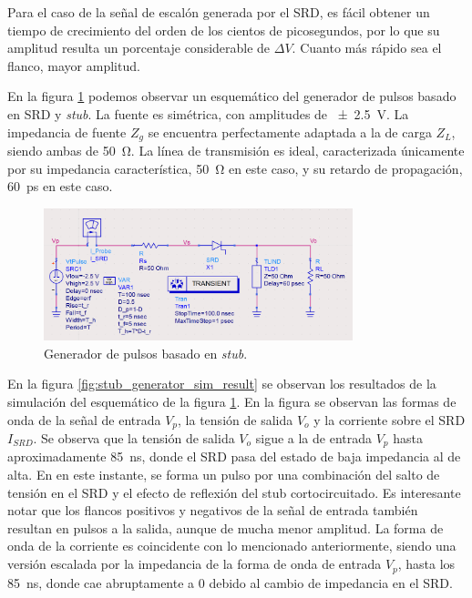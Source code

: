 Para el caso de la señal de escalón generada por el SRD, es fácil obtener un
tiempo de crecimiento del orden de los cientos de picosegundos, por lo que su
amplitud resulta un porcentaje considerable de $\Delta V$. Cuanto más rápido sea
el flanco, mayor amplitud.

En la figura \ref{fig:stub_generator_circuit} podemos observar un esquemático
del generador de pulsos basado en SRD y \textit{stub}. La fuente es simétrica,
con amplitudes de \qty{\pm 2.5}{\volt}. La impedancia de fuente $Z_g$ se
encuentra perfectamente adaptada a la de carga $Z_L$, siendo ambas de
\qty{50}{\ohm}. La línea de transmisión es ideal, caracterizada únicamente por
su impedancia característica, \qty{50}{\ohm} en este caso, y su retardo de
propagación, \qty{60}{\pico\second} en este caso.

\begin{figure}[t!]
    \centering
    \includegraphics[width=0.8\textwidth]{images/stub_generator_circuit.png}
    \caption{Generador de pulsos basado en \textit{stub}.}
    \label{fig:stub_generator_circuit}
\end{figure}

En la figura \ref{fig:stub_generator_sim_result} se observan los resultados de
la simulación del esquemático de la figura \ref{fig:stub_generator_circuit}. En
la figura  se observan las formas de onda de la señal de entrada $V_p$, la
tensión de salida $V_o$ y la corriente sobre el SRD $I_{SRD}$. Se observa que la
tensión de salida $V_o$ sigue a la de entrada $V_p$ hasta aproximadamente
\qty{85}{\nano\second}, donde el SRD pasa del estado de baja impedancia al de
alta. En en este instante, se forma un pulso por una combinación del salto de
tensión en el SRD y el efecto de reflexión del stub cortocircuitado. Es
interesante notar que los flancos positivos y negativos de la señal de entrada
también resultan en pulsos a la salida, aunque de mucha menor amplitud. La forma
de onda de la corriente es coincidente con lo mencionado anteriormente, siendo
una versión escalada por la impedancia de la forma de onda de entrada $V_p$,
hasta los \qty{85}{\nano\second}, donde cae abruptamente a $0$ debido al cambio
de impedancia en el SRD.

